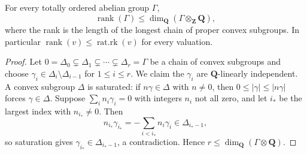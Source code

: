\begin{lemma}\label{lem:rank-leq-rational-rank}
For every totally ordered abelian group $\Gamma$,
\[
 \operatorname{rank}(\Gamma)\leq
 \dim_{\mathbf Q}(\Gamma\otimes_{\mathbf Z}\mathbf Q),
\]
where the rank is the length of the longest chain of proper convex
subgroups. In particular
$\operatorname{rank}(v)\leq\operatorname{rat.rk}(v)$ for every valuation.
\end{lemma}
\begin{proof}
Let $0=\Delta_0\subsetneq\Delta_1\subsetneq\cdots\subsetneq\Delta_r=\Gamma$
be a chain of convex subgroups and choose
$\gamma_i\in\Delta_i\setminus\Delta_{i-1}$ for $1\leq i\leq r$. We claim
the $\gamma_i$ are $\mathbf Q$-linearly independent. A convex subgroup
$\Delta$ is saturated: if $n\gamma\in\Delta$ with $n\neq0$, then
$0\leq|\gamma|\leq|n\gamma|$ forces $\gamma\in\Delta$. Suppose
$\sum_in_i\gamma_i=0$ with integers $n_i$ not all zero, and let $i_\ast$
be the largest index with $n_{i_\ast}\neq0$. Then
\[
 n_{i_\ast}\gamma_{i_\ast}=-\sum_{i<i_\ast}n_i\gamma_i
 \in\Delta_{i_\ast-1},
\]
so saturation gives $\gamma_{i_\ast}\in\Delta_{i_\ast-1}$, a
contradiction. Hence $r\leq\dim_{\mathbf Q}(\Gamma\otimes\mathbf Q)$.
\end{proof}

